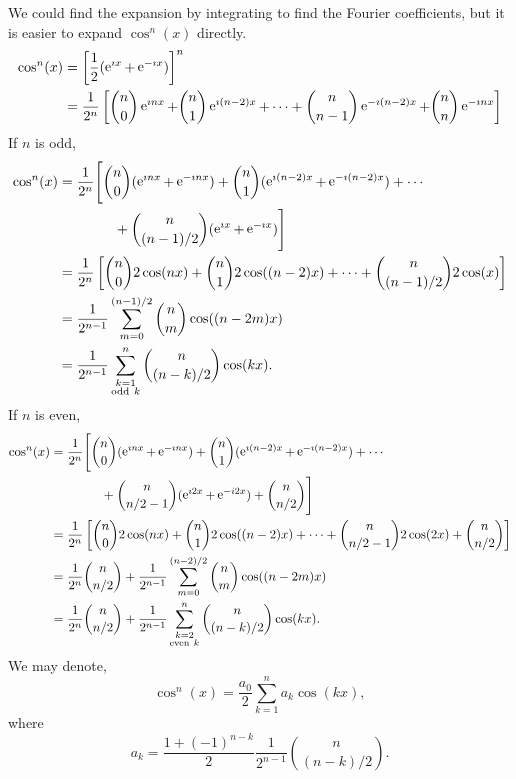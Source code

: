 {%
\begin{Solution}
  We could find the expansion by integrating to find the Fourier
  coefficients, but it is easier to expand $\cos^n(x)$ directly.
  \begin{align*}
    \cos^n(x)
    &= \left[ \frac{1}{2} (\mathop{\mathrm{e}}\nolimits^{\imath x} + \mathop{\mathrm{e}}\nolimits^{-\imath x}) \right]^n \\
    &= \frac{1}{2^n} \left[ \binom{n}{0} \mathop{\mathrm{e}}\nolimits^{\imath n x} +
      \binom{n}{1} \mathop{\mathrm{e}}\nolimits^{\imath (n-2)x} + \cdots +
      \binom{n}{n-1} \mathop{\mathrm{e}}\nolimits^{-\imath (n-2)x} + \binom{n}{n} \mathop{\mathrm{e}}\nolimits^{-\imath n x} \right]
  \end{align*}
  If $n$ is odd,
  \begin{align*}
    \cos^n(x)
    &= \frac{1}{2^n} \Bigg[ \binom{n}{0} (\e^{\imath n x} + \e^{-\imath n x})
    + \binom{n}{1} (\e^{\imath (n-2)x} + \e^{-\imath (n-2)x}) + \cdots \\
    &\qquad\qquad + \binom{n}{(n-1)/2}(\e^{\imath x} + \e^{-\imath x}) \Bigg] \\
    &= \frac{1}{2^n} \left[ \binom{n}{0} 2 \cos(n x)
      + \binom{n}{1} 2 \cos((n-2)x) + \cdots +
      \binom{n}{(n-1)/2}2\cos(x) \right] \\
    &= \frac{1}{2^{n-1}} \sum_{m=0}^{(n-1)/2} \binom{n}{m}
    \cos((n-2m)x) \\
    &= \frac{1}{2^{n-1}} \sum_{\substack{k = 1 \\ \mathrm{odd}\ k}}^n
    \binom{ n }{ (n-k)/2 } \cos(k x).
  \end{align*}
  If $n$ is even,
  \begin{align*}
    \cos^n(x)
    &= \frac{1}{2^n} \Bigg[ \binom{n}{0}(\mathop{\mathrm{e}}\nolimits^{\imath n x}+\mathop{\mathrm{e}}\nolimits^{-\imath n x})
    + \binom{n}{1} (\mathop{\mathrm{e}}\nolimits^{\imath (n-2)x}+\mathop{\mathrm{e}}\nolimits^{-\imath (n-2)x}) + \cdots \\
    &\qquad\qquad + \binom{n}{n/2-1} (\mathop{\mathrm{e}}\nolimits^{\imath 2 x}+\mathop{\mathrm{e}}\nolimits^{-i2x}) 
    + \binom{n}{n/2}\Bigg] \\
    &= \frac{1}{2^n} \left[ \binom{n}{0}2\cos(n x)
      + \binom{n}{1} 2\cos((n-2)x) + \cdots +
      \binom{n}{n/2-1} 2\cos(2x) + \binom{n}{n/2}\right] \\
    &= \frac{1}{2^n} \binom{n}{n/2} + \frac{1}{2^{n-1}} \sum_{m=0}^{(n-2)/2}
    \binom{n}{m} \cos((n-2m)x) \\
    &= \frac{1}{2^n} \binom{n}{n/2} 
    + \frac{1}{2^{n-1}} \sum_{\substack{k = 2 \\ \mathrm{even}\ k}}^n
    \binom{ n }{ (n-k)/2 } \cos(k x).
  \end{align*}
  We may denote,
  \[
  \boxed{
    \cos^n(x) = \frac{a_0}{2} \sum_{k = 1}^n a_k \cos(k x),
    }
  \]
  where
  \[
  \boxed{
    a_k = \frac{ 1 + (-1)^{n-k} }{2} \frac{1}{2^{n-1}} \binom{ n }{ (n-k)/2 }.
    }
  \]
\end{Solution}




}
